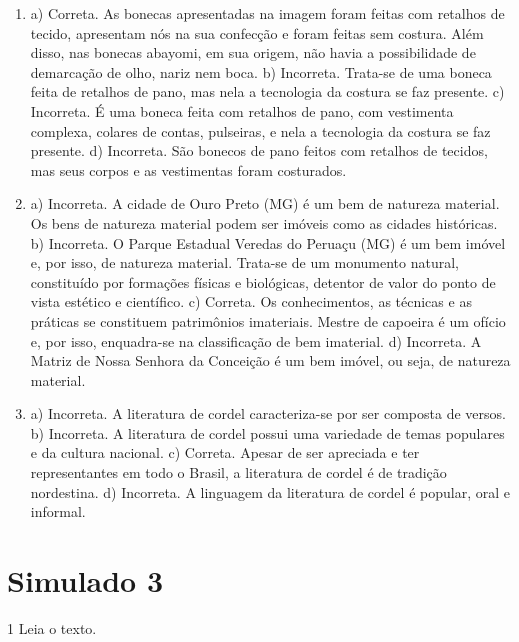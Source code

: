 \begin{enumerate}
\item
a) Correta. As bonecas apresentadas na imagem foram feitas com retalhos
de tecido, apresentam nós na sua confecção e foram feitas sem costura.
Além disso, nas bonecas abayomi, em sua origem, não havia a
possibilidade de demarcação de olho, nariz nem boca.
b) Incorreta. Trata-se de uma boneca feita de retalhos de pano, mas nela
a tecnologia da costura se faz presente.
c) Incorreta. É uma boneca feita com retalhos de pano, com vestimenta
complexa, colares de contas, pulseiras, e nela a tecnologia da costura se
faz presente.
d) Incorreta. São bonecos de pano feitos com retalhos de tecidos, mas seus
corpos e as vestimentas foram costurados.

\item
a)  Incorreta. A cidade de Ouro Preto (MG) é um bem de natureza material.
  Os bens de natureza material podem ser imóveis como as cidades
  históricas.
b) Incorreta. O Parque Estadual Veredas do Peruaçu (MG) é um bem imóvel
  e, por isso, de natureza material. Trata-se de um monumento natural,
  constituído por formações físicas e biológicas, detentor de valor do
  ponto de vista estético e científico.
c) Correta. Os conhecimentos, as técnicas e as práticas se constituem
  patrimônios imateriais. Mestre de capoeira é um ofício e, por isso,
  enquadra-se na classificação de bem imaterial.
d) Incorreta. A Matriz de Nossa Senhora da Conceição é um bem imóvel, ou
  seja, de natureza material.

\item
a) Incorreta. A literatura de cordel caracteriza-se por ser composta de versos.
b) Incorreta. A literatura de cordel possui uma variedade de temas
  populares e da cultura nacional.
c) Correta. Apesar de ser apreciada e ter representantes em todo o
  Brasil, a literatura de cordel é de tradição nordestina.
d) Incorreta. A linguagem da literatura de cordel é popular, oral e
  informal.
\end{enumerate}




\chapter{Simulado 3}

\num{1}  Leia o texto.


